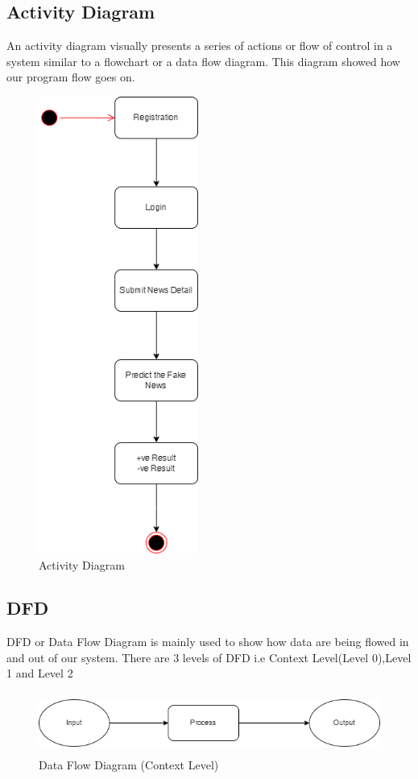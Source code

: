 \subsection{Activity Diagram}
An activity diagram visually presents a series of actions or flow of control in a system similar to a flowchart or a data flow diagram. This diagram showed how our program flow goes on.
\begin{figure}[H]
   \centering
    \includegraphics[height = 15cm]{Diagrams/Activity.drawio.png}
    \caption{Activity Diagram}
\end{figure}
\newpage
\subsection{DFD}
DFD or Data Flow Diagram is mainly used to show how data are being flowed in and out of our system. There are 3 levels of DFD i.e Context Level(Level 0),Level 1 and Level 2
\begin{figure}[H]
    \centering
    \includegraphics[height = 2cm]{Diagrams/dfd0new.drawio.png}
    \caption{Data Flow Diagram (Context Level)}
\end{figure}
\newpage
